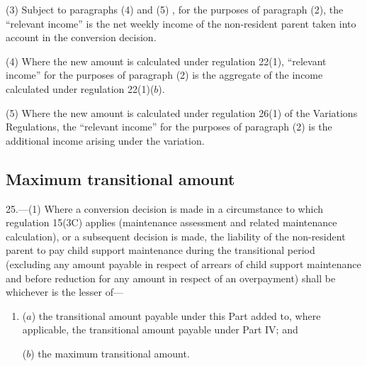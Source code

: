 \documentclass[12pt,a4paper]{article}
\begin{document}
(3) 
Subject to 
  paragraphs (4) and (5)%
, for  %
the purposes of paragraph (2), the “relevant income” is the net weekly income of the non-resident parent taken into account in the conversion decision.

(4) Where the new amount is calculated under regulation 22(1), “relevant income” for the purposes of paragraph (2) is the aggregate of the income calculated under regulation 22(1)($b$).

(5) Where the new amount is calculated under regulation 26(1) of the Variations Regulations, the “relevant income” for the purposes of paragraph (2) is the additional income arising under the variation.


\subsection[25. Maximum transitional amount]{Maximum transitional amount}

25.---(1)  Where a conversion decision is made in a circumstance 
to which regulation 15(3C)  %
applies (maintenance assessment and related maintenance calculation), or a subsequent decision is made, the liability of the non-resident parent to pay child support maintenance during the transitional period (excluding any amount payable in respect of arrears of child support maintenance and before reduction for any amount in respect of an overpayment) shall be whichever is the lesser of—
\begin{enumerate}\item[]

($a$) the transitional amount payable under this Part added to, where applicable, the transitional amount payable under Part IV; and

($b$) the maximum transitional amount.
\end{enumerate}
\end{document}
